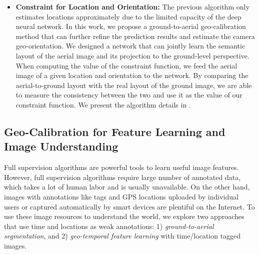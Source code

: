 \begin{itemize}[noitemsep]
  \item \textbf{Constraint for Location and Orientation:}
  The previous algorithm only estimates locations approximately
  due to the limited capacity of the deep neural network. In this
  work, we propose a ground-to-aerial geo-calibration method that can
  further refine the prediction results and estimate the
  camera geo-orientation.
  We designed a network that can jointly learn the semantic layout of
  the aerial image and its projection to the ground-level perspective.
  When computing the value of the constraint function, we feed the aerial
  image of a given location and orientation to the network. 
  By comparing the aerial-to-ground layout with the real layout of the
  ground image, we are able to measure the consistency between the two
  and use it as the value of our constraint function.
  We present the algorithm details in .
  \newline

\end{itemize}


\subsection{Geo-Calibration for Feature Learning and Image
Understanding}
Full supervision algorithms are powerful tools to learn useful image
features. However, full supervision algorithms require large number
of annotated data, which takes a lot of human labor and is usually
unavailable.
On the other hand, images with annotations like tags and GPS locations
uploaded by individual users or captured automatically by smart
devices are plentiful on the Internet.
To use these image resources to understand the world,
we explore two approaches that use time and
locations as weak annotations: 1) {\em ground-to-aerial segmentation}, and 2)
{\em geo-temporal feature learning} with time/location tagged images.
 
